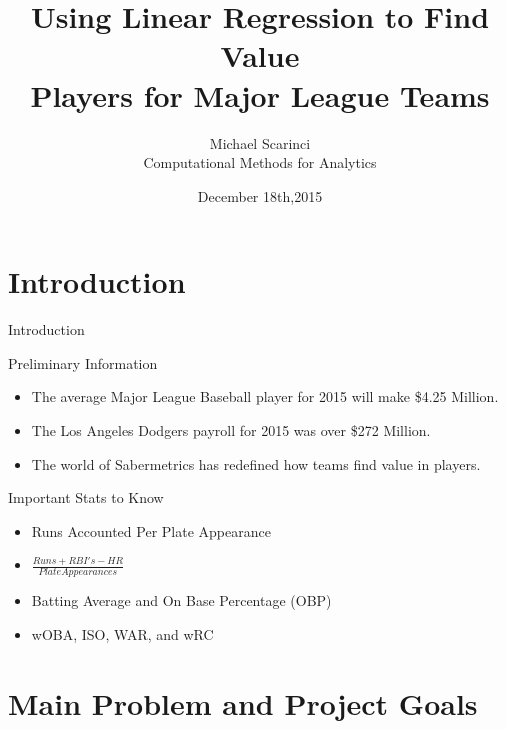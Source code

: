 \documentclass{beamer}
\title[Baseball Value]{Using Linear Regression to Find Value \\Players for Major League Teams} \author{Michael Scarinci\\Computational Methods for Analytics} \date{December 18th,2015}
\begin{document}
\begin{frame}
   \titlepage
\end{frame}


\section{Introduction}

\begin{frame}{Introduction}

\begin{block}{Preliminary Information}

\end{block}

\begin{itemize}
   \item  The average Major League Baseball player for 2015 will make \$4.25 Million. 
   \pause
   \item The Los Angeles Dodgers payroll for 2015 was over \$272 Million.
   \pause
   \item The world of Sabermetrics has redefined how teams find value in players.

\end{itemize}

\end{frame}

\begin{frame}{Important Stats to Know}

\begin{itemize}
	\item Runs Accounted Per Plate Appearance 
	\pause
	\item $\frac{Runs + RBI's - HR}{Plate Appearances}$
	\pause
	\item Batting Average and On Base Percentage (OBP)
	\pause
	\item wOBA, ISO, WAR, and wRC
	
\end{itemize}

\end{frame}

\section{Main Problem and Project Goals}
\end{document}
